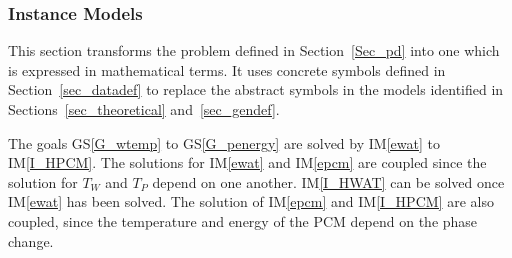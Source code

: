 \documentclass[12pt]{article}
\newcommand{\gsref}[1]{GS\ref{#1}}
\newcommand{\iref}[1]{IM\ref{#1}}
\begin{document}
\subsubsection{Instance Models} \label{sec_instance}    

This section transforms the problem defined in Section~\ref{Sec_pd} into 
one which is expressed in mathematical terms. It uses concrete symbols defined 
in Section~\ref{sec_datadef} to replace the abstract symbols in the models 
identified in Sections~\ref{sec_theoretical} and~\ref{sec_gendef}.

The goals \gsref{G_wtemp} to \gsref{G_penergy} are solved by \iref{ewat} to
\iref{I_HPCM}.  The solutions for \iref{ewat} and \iref{epcm} are
coupled since the solution for $T_W$ and $T_P$ depend on one another.
\iref{I_HWAT} can be solved once \iref{ewat} has been solved.  The solution of
\iref{epcm} and \iref{I_HPCM} are also coupled, since the temperature and energy
of the PCM depend on the phase change.


~\newline

\end{document}
